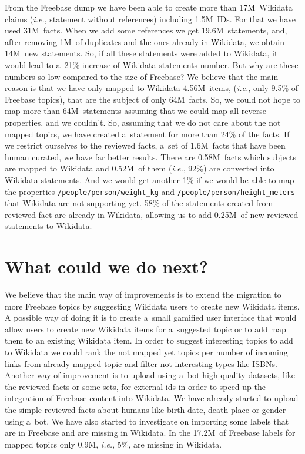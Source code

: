 \documentclass{sig-alternate}
\begin{document}
From the Freebase dump we have been able to create more than 17M~Wikidata claims
(\emph{i.e.}, statement without references) including 1.5M~IDs.
For that we have used 31M~facts.
When we add some references we get 19.6M~statements, and, after removing 1M~of duplicates
and the ones already in Wikidata, we obtain 14M~new statements.
So, if all these statements were added to Wikidata,
it would lead to a~21\% increase of Wikidata statements number.
But why are these numbers so low compared to the size of Freebase?
We believe that the main reason is that we have only mapped to Wikidata 4.56M~items, (\emph{i.e.},
only 9.5\% of Freebase topics), that are the subject of only 64M~facts.
So, we could not hope to map more than 64M~statements
assuming that we could map all reverse properties, and we couldn't.
So, assuming that we do not care about the not mapped topics,
we have created a~statement for more than 24\% of the facts.
If we restrict ourselves to the reviewed facts, a~set of 1.6M~facts
that have been human curated, we have far better results.
There are 0.58M~facts which subjects are mapped to Wikidata and 0.52M~of them
(\emph{i.e.}, 92\%) are converted into Wikidata statements.
And we would get another 1\% if we would be able
to map the properties \texttt{/people/person/weight\_kg}
and \texttt{/people/person/height\_meters} that Wikidata are not supporting yet.
58\% of the statements created from reviewed fact are already in Wikidata,
allowing us to add 0.25M~of new reviewed statements to Wikidata.

\section{What could we do next?}

We believe that the main way of improvements is to extend the migration to more Freebase topics
by suggesting Wikidata users to create new Wikidata items.
A possible way of doing it is to create a~small gamified user interface that would allow users
to create new Wikidata items for a~suggested topic or to add map them to an existing Wikidata item.
In order to suggest interesting topics to add to Wikidata
we could rank the not mapped yet topics per number of incoming links from already mapped topic
and filter not interesting types like ISBNs.
Another way of improvement is to upload using a~bot high quality datasets,
like the reviewed facts or some sets,
for external ids in order to speed up the integration of Freebase content into Wikidata.
We have already started to upload the simple reviewed facts about humans
like birth date, death place or gender using a~bot.
We have also started to investigate on importing some labels
that are in Freebase and are missing in Wikidata.
In the 17.2M~of Freebase labels for mapped topics only 0.9M, \emph{i.e.},
5\%, are missing in Wikidata.
\end{document}
